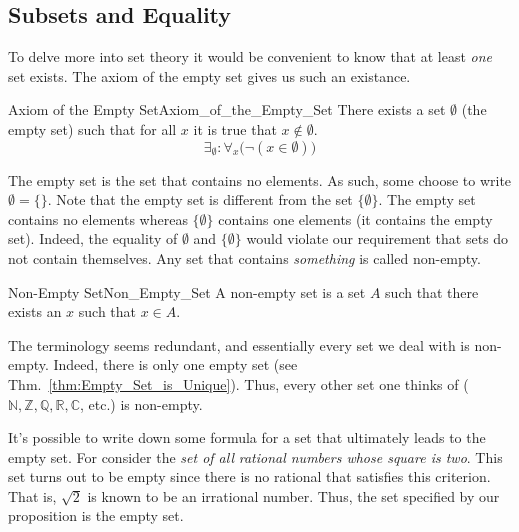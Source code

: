     \subsection{Subsets and Equality}
        To delve more into set theory it would be convenient to know that at
        least \textit{one} set exists. The axiom of the empty
        set gives us such an existance.
        \begin{faxiom}{Axiom of the Empty Set}{Axiom_of_the_Empty_Set}
            There exists a set $\emptyset$ (the \gls{empty set}) such that for
            all $x$ it is true that $x\notin\emptyset$.
            \begin{equation*}
                \exists_{\emptyset}:\forall_{x}\big(\neg(x\in\emptyset)\big)
            \end{equation*}
        \end{faxiom}
        The empty set is the set that contains no elements. As such, some choose
        to write $\emptyset=\{\}$. Note that the empty set is different from the
        set $\{\emptyset\}$. The empty set contains no elements whereas
        $\{\emptyset\}$ contains one elements (it contains the empty set).
        Indeed, the equality of $\emptyset$ and $\{\emptyset\}$ would violate
        our requirement that sets do not contain themselves. Any set that
        contains \textit{something} is called non-empty.
        \begin{fdefinition}{Non-Empty Set}{Non_Empty_Set}
            A \gls{non-empty set} is a \gls{set} $A$ such that there exists an
            $x$ such that $x\in{A}$.
        \end{fdefinition}
        \begin{example}
            The terminology seems redundant, and essentially every set we deal
            with is non-empty. Indeed, there is only one empty set
            (see Thm.~\ref{thm:Empty_Set_is_Unique}). Thus, every other set one
            thinks of ($\mathbb{N},\mathbb{Z},\mathbb{Q},\mathbb{R},\mathbb{C}$,
            etc.) is non-empty.
        \end{example}
        \begin{example}
            It's possible to write down some formula for a set that ultimately
            leads to the empty set. For consider the \textit{set of all}
            \textit{rational numbers whose square is two}. This set turns out to
            be empty since there is no rational that satisfies this criterion.
            That is, $\sqrt{2}$ is known to be an irrational number. Thus, the
            set specified by our proposition is the empty set.
        \end{example}
